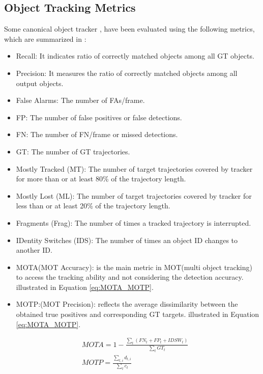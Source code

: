 \documentclass[10pt,twocolumn,letterpaper]{article}  %
\begin{document}
\subsection{Object Tracking Metrics}
Some canonical object tracker \cite{bewley2016simple}, \cite{wojke2017simple} have been evaluated using the following metrics, which are summarized in \cite{bisio2022systematic}:
\begin{itemize}
	\item Recall: It indicates ratio of correctly matched objects among all GT objects.
	\item Precision: It measures the ratio of correctly matched objects among all output objects.
	\item False Alarms: The number of FAs/frame.
	\item FP: The number of false positives or false detections.
	\item FN: The number of FN/frame or missed detections.
	\item GT: The number of GT trajectories.
	\item Mostly Tracked (MT): The number of target trajectories covered by tracker for more than or at least 80\% of the trajectory length.
	\item Mostly Lost (ML): The number of target trajectories covered by tracker for less than or at least 20\% of the trajectory length.
	\item Fragments (Frag): The number of times a tracked trajectory is interrupted.
	\item IDentity Switches (IDS): The number of times an object ID changes to another ID.
	\item MOTA(MOT Accuracy): is the main metric in MOT(multi object tracking) to access the tracking ability and not considering the detection accuracy. illustrated in Equation \ref{eq:MOTA_MOTP}.
	\item MOTP:(MOT Precision): reflects the average dissimilarity between the obtained true positives and corresponding GT targets. illustrated in Equation \ref{eq:MOTA_MOTP}.
	
\end{itemize}
\begin{equation}
	\label{eq:MOTA_MOTP}
	\begin{aligned}
		&MOTA = 1 - \frac{\sum_t(FN_t + FP_t + IDSW_t)}{\sum_t GT_t}\\
		&MOTP = \frac{\sum_{t,i} d_{t,i}}{\sum_t{c_t}} \\
	\end{aligned}
\end{equation}
\end{document}
